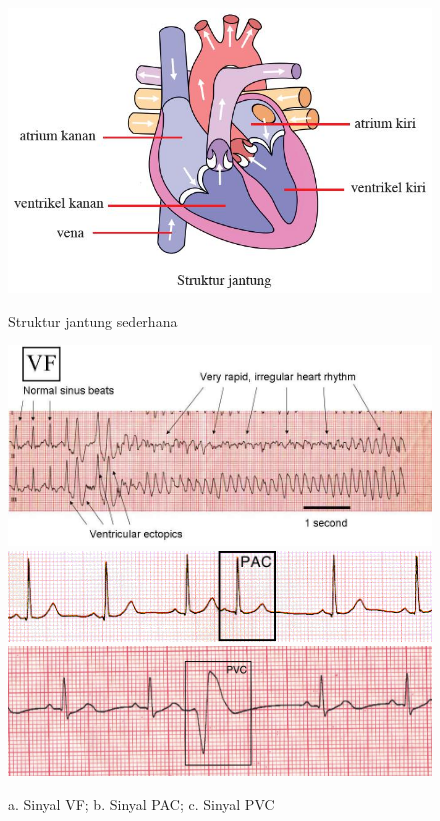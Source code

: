 \begin{figure}[H]
    \centering
    \includegraphics[scale=0.4]{images/jantung.jpg}
    \caption{Struktur jantung sederhana}
	\includegraphics[scale=1.2]{images/VF.jpg}
    \includegraphics[scale=0.5]{images/PAC1.png}
	\includegraphics[scale=0.25]{images/PVC1.png}
    \caption{a. Sinyal VF; b. Sinyal PAC; c. Sinyal PVC}
    \label{fig:contoh_aritmia}	
\end{figure}

